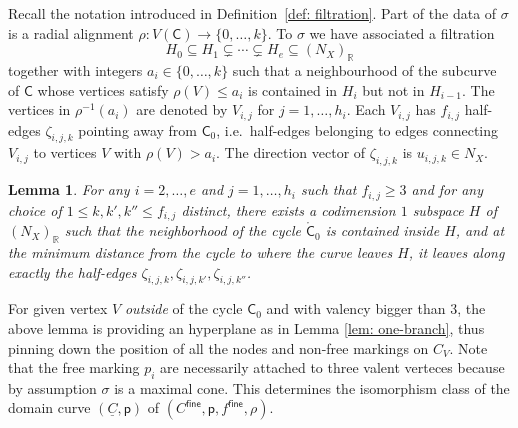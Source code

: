 \documentclass{article}
\newtheorem{lemma}[definition]{Lemma}
\newcommand{\tropC}{\mathsf{C}}
\newcommand{\nbhdtropC}{\mathring{\tropC}_0}
\begin{document}
Recall the notation introduced in Definition~\ref{def: filtration}. Part of the data of $\sigma$ is a radial alignment 
$
\rho : V(\tropC) \to \{0,\ldots,k\}.
$
To $\sigma$ we have associated a filtration
$$
H_0 \subseteq H_1 \subsetneq \cdots \subsetneq H_e \subseteq (N_X)_\mathbb{R}
$$
together with integers $a_i \in \{0,\ldots,k\}$ such that a neighbourhood of the subcurve of $\tropC$ whose vertices satisfy $\rho(V) \leq a_i$ is contained in $H_i$ but not in $H_{i-1}$. The vertices in $\rho^{-1}(a_i)$ are denoted by $V_{i,j}$ for $j = 1,\ldots, h_i$. Each $V_{i,j}$ has $f_{i,j}$ half-edges $\zeta_{i,j,k}$ pointing away from $\tropC_0$, i.e.\ half-edges belonging to edges connecting $V_{i,j}$ to vertices $V$ with $\rho(V) > a_i$. The direction vector of $\zeta_{i,j,k}$ is $u_{i,j,k} \in N_X$.



\begin{lemma} \label{lem: good-plane}
    For any $i=2,\ldots, e$ and $j=1,\ldots, h_{i}$ such that $f_{i,j} \geq 3$ and for any choice of $1 \leq k, k', k'' \leq f_{i,j}$ distinct, there exists a codimension $1$ subspace $H$ of $(N_X)_{\mathbb{R}}$ such that the neighborhood of the cycle $\nbhdtropC$ is contained inside $H$, and at the minimum distance from the cycle to where the curve leaves $H$, it leaves along exactly the half-edges $\zeta_{i,j,k}, \zeta_{i,j,k'}, \zeta_{i,j,k''}$. 
\end{lemma}

For given vertex $V$ \emph{outside} of the cycle $\tropC_0$ and with valency bigger than $3$, the above lemma is providing an hyperplane as in Lemma \ref{lem: one-branch}, thus pinning down the position of all the nodes and non-free markings on $C_V$. Note that the free marking $p_i$ are necessarily attached to three valent verteces because by assumption $\sigma$ is a maximal cone. This determines the isomorphism class of the domain curve $(\underline{C},\mathsf{p})$ of $(C^{\mathsf{fine}}, \mathsf{p}, f^{\mathsf{fine}}, \rho)$.
\end{document}
